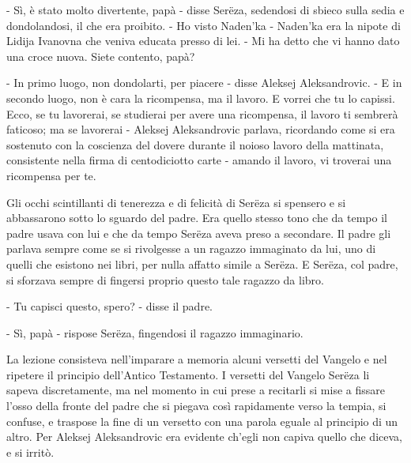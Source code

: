 - Sì, è stato molto divertente, papà - disse Serëza, sedendosi di sbieco sulla sedia e dondolandosi, il che era proibito. - Ho visto Naden'ka - Naden'ka era la nipote di Lidija Ivanovna che veniva educata presso di lei. - Mi ha detto che vi hanno dato una croce nuova. Siete contento, papà? 

- In primo luogo, non dondolarti, per piacere - disse Aleksej Aleksandrovic. - E in secondo luogo, non è cara la ricompensa, ma il lavoro. E vorrei che tu lo capissi. Ecco, se tu lavorerai, se studierai per avere una ricompensa, il lavoro ti sembrerà faticoso; ma se lavorerai - Aleksej Aleksandrovic parlava, ricordando come si era sostenuto con la coscienza del dovere durante il noioso lavoro della mattinata, consistente nella firma di centodiciotto carte - amando il lavoro, vi troverai una ricompensa per te. 

Gli occhi scintillanti di tenerezza e di felicità di Serëza si spensero e si abbassarono sotto lo sguardo del padre. Era quello stesso tono che da tempo il padre usava con lui e che da tempo Serëza aveva preso a secondare. Il padre gli parlava sempre come se si rivolgesse a un ragazzo immaginato da lui, uno di quelli che esistono nei libri, per nulla affatto simile a Serëza. E Serëza, col padre, si sforzava sempre di fingersi proprio questo tale ragazzo da libro. 

- Tu capisci questo, spero? - disse il padre. 

- Sì, papà - rispose Serëza, fingendosi il ragazzo immaginario. 

La lezione consisteva nell'imparare a memoria alcuni versetti del Vangelo e nel ripetere il principio dell'Antico Testamento. I versetti del Vangelo Serëza li sapeva discretamente, ma nel momento in cui prese a recitarli si mise a fissare l'osso della fronte del padre che si piegava così rapidamente verso la tempia, si confuse, e traspose la fine di un versetto con una parola eguale al principio di un altro. Per Aleksej Aleksandrovic era evidente ch'egli non capiva quello che diceva, e si irritò. 

